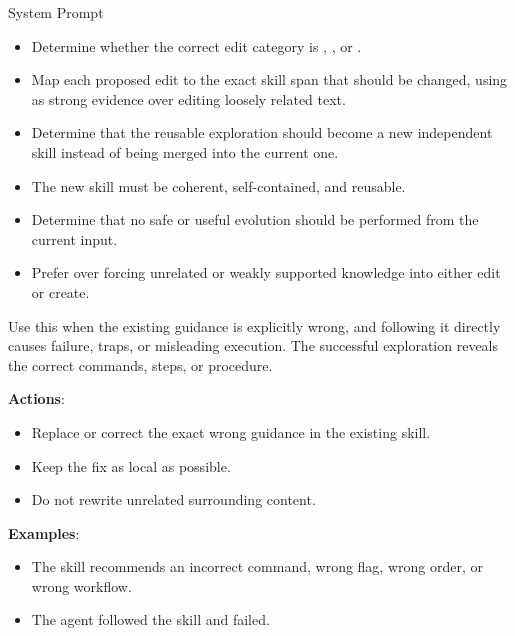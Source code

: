 \begin{svpromptbox}{System Prompt}
\begin{itemize}
\item Determine whether the correct edit category is , , or .
\item Map each proposed edit to the exact skill span that should be changed, using  as strong evidence over editing loosely related text.
\end{itemize}
\smallskip
{}
\begin{itemize}
\item Determine that the reusable exploration should become a new independent skill instead of being merged into the current one.
\item The new skill must be coherent, self-contained, and reusable.
\end{itemize}
\smallskip
{}
\begin{itemize}
\item Determine that no safe or useful evolution should be performed from the current input.
\item Prefer  over forcing unrelated or weakly supported knowledge into either edit or create.
\end{itemize}
\smallskip
{}
\smallskip
{}
\smallskip
Use this when the existing guidance is explicitly wrong, and following it directly causes failure, traps, or misleading execution. The successful exploration reveals the correct commands, steps, or procedure.\par
\smallskip
\textbf{Actions}:\par
\smallskip
\begin{itemize}
\item Replace or correct the exact wrong guidance in the existing skill.
\item Keep the fix as local as possible.
\item Do not rewrite unrelated surrounding content.
\end{itemize}
\smallskip
\textbf{Examples}:\par
\smallskip
\begin{itemize}
\item The skill recommends an incorrect command, wrong flag, wrong order, or wrong workflow.
\item The agent followed the skill and failed.

\end{itemize}
\end{svpromptbox}
